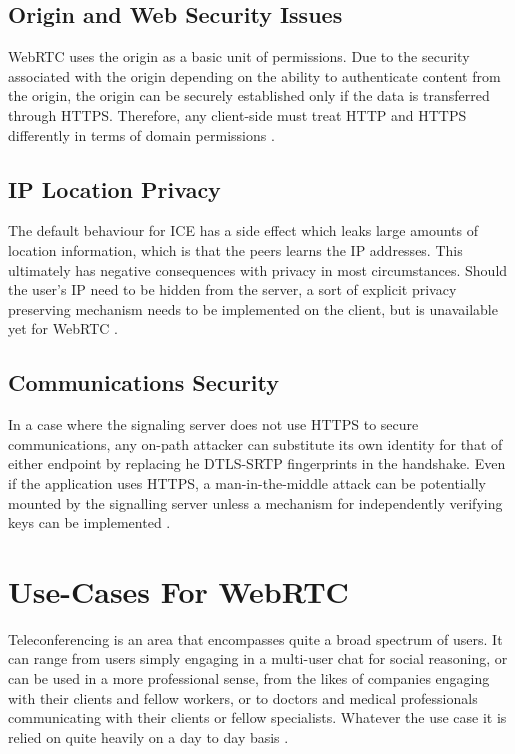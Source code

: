 \subsection{Origin and Web Security Issues}
WebRTC uses the origin as a basic unit of permissions. Due to the security associated with the origin  depending on the ability to authenticate content from the origin, the origin can be securely established only if the data is transferred through HTTPS. Therefore, any client-side must treat HTTP and HTTPS differently in terms of domain permissions \cite{rescorla2013webrtc}.

\subsection{IP Location Privacy}
The default behaviour for ICE has a side effect which leaks large amounts of location information, which is that the peers learns the IP addresses. This ultimately has negative consequences with privacy in most circumstances. Should the user’s IP need to be hidden from the server, a sort of explicit privacy preserving mechanism needs to be implemented on the client, but is unavailable yet for WebRTC \cite{rescorla2013webrtc}.

\subsection{Communications Security}
In a case where the signaling server does not use HTTPS to secure communications, any on-path attacker can substitute its own identity for that of either endpoint by replacing he DTLS-SRTP fingerprints in the handshake.
Even if the application uses HTTPS, a man-in-the-middle attack can be potentially mounted by the signalling server unless a mechanism for independently verifying keys can be implemented \cite{rescorla2013webrtc}.

\section{Use-Cases For WebRTC}
Teleconferencing is an area that encompasses quite a broad spectrum of users. It can range from users simply engaging in a multi-user chat for social reasoning, or can be used in a more professional sense, from the likes of companies engaging with their clients and fellow workers, or to doctors and medical professionals communicating with their clients or fellow specialists. Whatever the use case it is relied on quite heavily on a day to day basis \cite{14003034520191201}.

